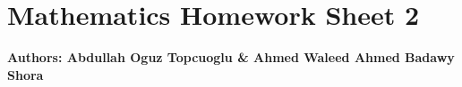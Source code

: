 \documentclass{article}
\begin{document}
\section*{\huge Mathematics Homework Sheet 2}
\begin{flushright}
   \textbf{Authors: Abdullah Oguz Topcuoglu \& Ahmed Waleed Ahmed Badawy Shora}
\end{flushright}
\end{document}
